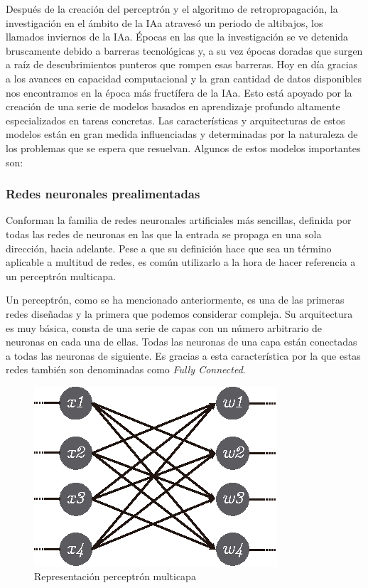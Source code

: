 Después de la creación del perceptrón y el algoritmo de retropropagación, la
investigación en el ámbito de la \gls{IAa} atravesó un periodo de altibajos, los llamados
inviernos de la \gls{IAa}. Épocas en las que la investigación se ve detenida
bruscamente debido a barreras tecnológicas y, a su vez épocas doradas que surgen
a raíz de descubrimientos punteros que rompen esas barreras. Hoy en día gracias
a los avances en capacidad computacional y la gran cantidad de datos disponibles
nos encontramos en la época más fructífera de la \gls{IAa}. Esto está apoyado por la
creación de una serie de modelos basados en aprendizaje profundo altamente
especializados en tareas concretas. Las características y arquitecturas de estos
modelos están en gran medida influenciadas y determinadas por la naturaleza de
los problemas que se espera que resuelvan. Algunos de estos modelos importantes
son:


\subsubsection{Redes neuronales prealimentadas}

Conforman la familia de redes neuronales artificiales más sencillas, definida
por todas las redes de neuronas en las que la entrada se propaga en una sola
dirección, hacia adelante. Pese a que su definición hace que sea un término
aplicable a multitud de redes, es común utilizarlo a la hora de hacer referencia
a un perceptrón multicapa. 

Un perceptrón, como se ha mencionado anteriormente, es una de las primeras redes
diseñadas y la primera que podemos considerar compleja. Su arquitectura es muy
básica, consta de una serie de capas con un número arbitrario de neuronas en
cada una de ellas. Todas las neuronas de una capa están conectadas a todas las
neuronas de  siguiente. Es gracias a esta característica por la que estas redes
también son denominadas como \textit{Fully Connected}.

\begin{figure}[H]
	\includegraphics[scale=1.5]{imagenes/perceptron_multicapa.eps}
	\centering
	\captionsetup{justification=centering}
    \caption{Representación perceptrón multicapa}
    \label{Representación perceptrón multicapa}
\end{figure}

